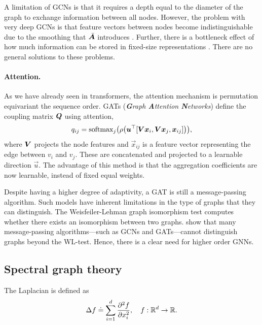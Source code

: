 A limitation of GCNs is that it requires a depth equal to the diameter of the graph to exchange
information between all nodes. However, the problem with very deep GCNs is that feature vectors
between nodes become indistinguishable due to the smoothing that $\bar{\bm{A}}$ introduces
\citep{chen2020measuring}. Further, there is a bottleneck effect of how much information can be
stored in fixed-size representations \citep{alon2020bottleneck}. There are no general solutions to
these problems.

\paragraph{Attention.}

As we have already seen in transformers, the attention mechanism is permutation equivariant \wrt
the sequence order. GATs
(\textit{\textbf{G}raph \textbf{A}ttention \textbf{N}etworks}) \citep{velivckovic2017graph} define
the coupling matrix $\bm{Q}$ using attention, \[
    q_{ij} = \mathrm{softmax}_j \lft( \rho \lft( \transpose{\vec{u}} [\mat{V} \vec{x}_i, \mat{V} \vec{x}_j, \vec{x}_{ij}] \rgt) \rgt),
\]
where $\bm{V}$ projects the node features and $\vec{x}_{ij}$ is a feature vector representing the
edge between $v_i$ and $v_j$. These are concatenated and projected to a learnable direction
$\vec{u}$. The advantage of this method is that the aggregation coefficients are now learnable,
instead of fixed equal weights.

Despite having a higher degree of adaptivity, a GAT is still a message-passing algorithm. Such
models have inherent limitations in the type of graphs that they can distinguish. The
Weisfeiler-Lehman graph isomorphism test computes whether there exists an isomorphism between two
graphs. \citet{morris2019weisfeiler} show that many message-passing algorithms---such as GCNs and
GATs---cannot distinguish graphs beyond the WL-test. Hence, there is a clear need for higher order
GNNs.

\subsection{Spectral graph theory}

\begin{definition}
    The Laplacian is defined as \[
        \Delta f \doteq \sum_{i=1}^{d} \pdv[order=2]{f}{x_i}, \quad f: \mathbb{R}^d \to \mathbb{R}.
    \]
\end{definition}

